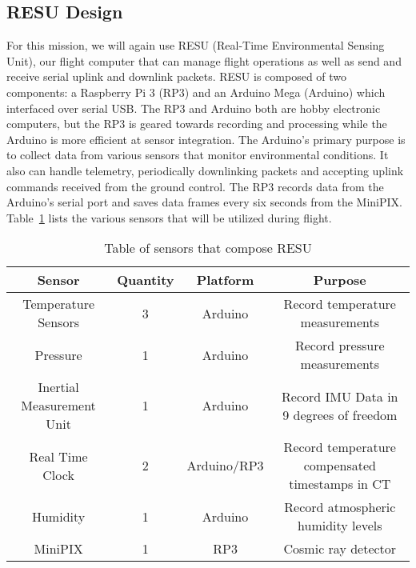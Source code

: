 \subsection{RESU Design}
\label{sec:RESU-Design}

For this mission, we will again use RESU (Real-Time Environmental Sensing Unit), our flight computer that can manage flight operations as well as send and receive serial uplink and downlink packets. RESU is composed of two components: a Raspberry Pi 3 (RP3) and an Arduino Mega (Arduino) which interfaced over serial USB.  The RP3 and Arduino both are hobby electronic computers, but the RP3 is geared towards recording and processing while the Arduino is more efficient at sensor integration.  The Arduino's primary purpose is to collect data from various sensors that monitor environmental conditions. It also can handle telemetry, periodically downlinking packets and accepting uplink commands received from the ground control. The RP3 records data from the Arduino's serial port and saves data frames every six seconds from the MiniPIX.  Table~\ref{tab:Sensors} lists the various sensors that will be utilized during flight.

\begin{table}[h!]
\centering
\caption{Table of sensors that compose RESU}
\label{tab:Sensors}
\bigskip
\begin{tabular}{|c|c|c|c|}
\hline
\multicolumn{1}{|c|}{\bfseries Sensor} & {\bfseries Quantity} & {\bfseries Platform} & {\bfseries Purpose} \\
\hline
    Temperature Sensors         	& 3 & Arduino  		& Record temperature measurements  \\ \hline
    Pressure        				& 1 & Arduino 		& Record pressure measurements \\ \hline
    Inertial Measurement Unit       					& 1 & Arduino 		& Record IMU Data in 9 degrees of freedom \\ \hline    
    Real Time Clock 				& 2 & Arduino/RP3 	& Record temperature compensated timestamps in CT \\\hline
    Humidity        				& 1 & Arduino 		& Record atmospheric humidity levels \\ \hline
    MiniPIX         				& 1 & RP3     		& Cosmic ray detector \\ \hline
\end{tabular}
\end{table}

